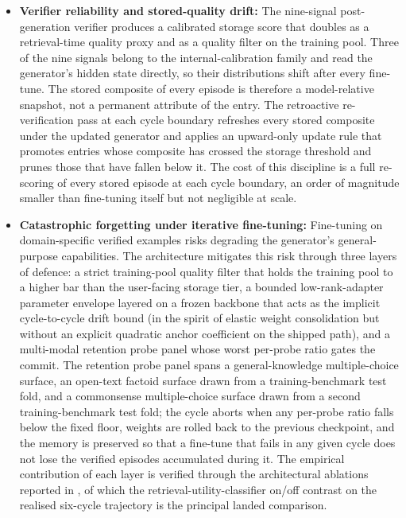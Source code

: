 \begin{itemize}
    \item \textbf{Verifier reliability and stored-quality drift:} The nine-signal post-generation verifier produces a calibrated storage score that doubles as a retrieval-time quality proxy and as a quality filter on the training pool. Three of the nine signals belong to the internal-calibration family and read the generator's hidden state directly, so their distributions shift after every fine-tune. The stored composite of every episode is therefore a model-relative snapshot, not a permanent attribute of the entry. The retroactive re-verification pass at each cycle boundary refreshes every stored composite under the updated generator and applies an upward-only update rule that promotes entries whose composite has crossed the storage threshold and prunes those that have fallen below it. The cost of this discipline is a full re-scoring of every stored episode at each cycle boundary, an order of magnitude smaller than fine-tuning itself but not negligible at scale.

    \item \textbf{Catastrophic forgetting under iterative fine-tuning:} Fine-tuning on domain-specific verified examples risks degrading the generator's general-purpose capabilities. The architecture mitigates this risk through three layers of defence: a strict training-pool quality filter that holds the training pool to a higher bar than the user-facing storage tier, a bounded low-rank-adapter parameter envelope layered on a frozen backbone that acts as the implicit cycle-to-cycle drift bound (in the spirit of elastic weight consolidation \cite{doi:10.1073/pnas.1611835114} but without an explicit quadratic anchor coefficient on the shipped path), and a multi-modal retention probe panel whose worst per-probe ratio gates the commit. The retention probe panel spans a general-knowledge multiple-choice surface, an open-text factoid surface drawn from a training-benchmark test fold, and a commonsense multiple-choice surface drawn from a second training-benchmark test fold; the cycle aborts when any per-probe ratio falls below the fixed floor, weights are rolled back to the previous checkpoint, and the memory is preserved so that a fine-tune that fails in any given cycle does not lose the verified episodes accumulated during it. The empirical contribution of each layer is verified through the architectural ablations reported in , of which the retrieval-utility-classifier on/off contrast on the realised six-cycle trajectory is the principal landed comparison.


\end{itemize}
